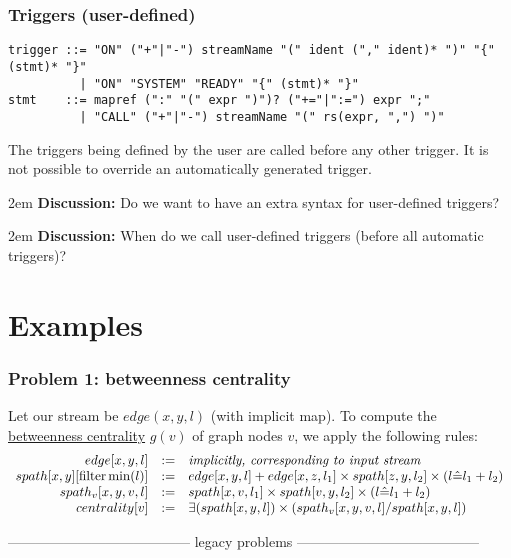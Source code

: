 \documentclass[11pt]{article}
\def\discuss#1{\begingroup\par\leftskip2em {\footnotesize {\bf Discussion:} #1} \par\endgroup}
\begin{document}
\subsubsection*{Triggers (user-defined)}
\begin{verbatim}
trigger ::= "ON" ("+"|"-") streamName "(" ident ("," ident)* ")" "{" (stmt)* "}"
          | "ON" "SYSTEM" "READY" "{" (stmt)* "}"
stmt    ::= mapref (":" "(" expr ")")? ("+="|":=") expr ";"
          | "CALL" ("+"|"-") streamName "(" rs(expr, ",") ")"
\end{verbatim}
The triggers being defined by the user are called before any other trigger. It is not possible to override an automatically generated trigger.
\discuss{Do we want to have an extra syntax for user-defined triggers?}
\discuss{When do we call user-defined triggers (before all automatic triggers)?}

\section*{Examples}
\subsubsection*{Problem 1: betweenness centrality}
Let our stream be $edge(x,y,l)$ (with implicit map). To compute the \href{http://en.wikipedia.org/wiki/Betweenness_centrality}{betweenness centrality} $g(v)$ of graph nodes $v$, we apply the following rules:
\[\begin{array}{rcl}
edge[x,y,l] & := & \text{\it implicitly, corresponding to input stream} \\
spath[x,y][{\rm filter} \min(l)] & := & edge[x,y,l] +  edge[x,z,l_1] \times spath[z,y,l_2] \times (l\hat= l_1+l_2)\\
spath_v[x,y,v,l] & := & spath[x,v,l_1] \times spath[v,y,l_2] \times (l\hat= l_1+l_2)\\
centrality[v] & := & \exists(spath[x,y,l]) \times (spath_v[x,y,v,l] / spath[x,y,l])
\end{array}\]

{\center --------------------------------------- legacy problems ---------------------------------------}
\end{document}
